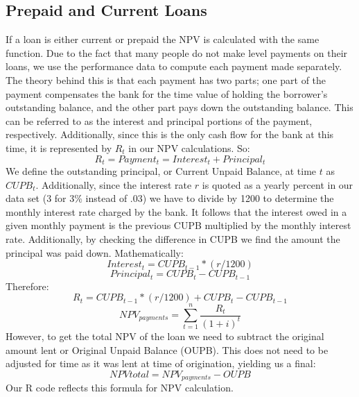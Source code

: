 \documentclass[12 pt]{uncw_thesis}
\theoremstyle{plain}
\theoremstyle{remark}
\theoremstyle{definition}
\begin{document}
\subsection{Prepaid and Current Loans}
If a loan is either current or prepaid the NPV is calculated with the same function. Due to the fact that many people do not make level payments on their loans, we use the performance data to compute each payment made separately. The theory behind this is that each payment has two parts; one part of the payment compensates the bank for the time value of holding the borrower's outstanding balance, and the other part pays down the outstanding balance. This can be referred to as the interest and principal portions of the payment, respectively. Additionally, since this is the only cash flow for the bank at this time, it is represented by \(R_t\) in our NPV calculations.  So:
\[R_t = Payment_t = Interest_t + Principal_t\]
We define the outstanding principal, or Current Unpaid Balance, at time \(t\) as \(CUPB_t\). Additionally, since the interest rate \(r\) is quoted as a yearly percent in our data set (3 for 3\% instead of .03) we have to divide by 1200 to determine the monthly interest rate charged by the bank. It follows that the interest owed in a given monthly payment is the previous CUPB multiplied by the monthly interest rate. Additionally, by checking the difference in CUPB we find the amount the principal was paid down. Mathematically:
\[Interest_t = CUPB_{t-1}*(r/1200)\]
\[Principal_t = CUPB_{t} - CUPB_{t-1}\]
Therefore: 
\[R_t = CUPB_{t-1}*(r/1200) + CUPB_{t} - CUPB_{t-1}\]
\[NPV_{payments} = \sum_{t=1}^n \frac{R_t}{(1+i)^t}\]
However, to get the total NPV of the loan we need to subtract the original amount lent or Original Unpaid Balance (OUPB). This does not need to be adjusted for time as it was lent at time of origination, yielding us a final:
\[NPV{total} = NPV_{payments} - OUPB\]
Our R code reflects this formula for NPV calculation.
\end{document}
